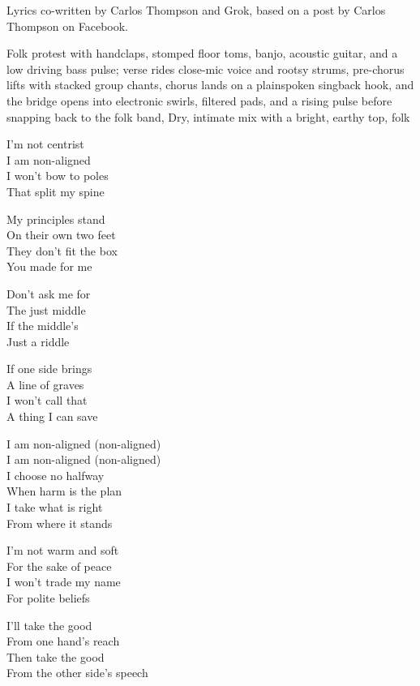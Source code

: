 
\label{sec:no-middle-seat}
\begin{notes}
Lyrics co-written by Carlos Thompson and Grok, based on a post by Carlos Thompson on Facebook.
\end{notes}
\begin{style}
Folk protest with handclaps, stomped floor toms, banjo, acoustic guitar, and a low driving bass pulse; verse rides close-mic voice and rootsy strums, pre-chorus lifts with stacked group chants, chorus lands on a plainspoken singback hook, and the bridge opens into electronic swirls, filtered pads, and a rising pulse before snapping back to the folk band, Dry, intimate mix with a bright, earthy top, folk
\end{style}
\begin{lyrics}
I’m not centrist\\
I am non-aligned\\
I won’t bow to poles\\
That split my spine

My principles stand\\
On their own two feet\\
They don’t fit the box\\
You made for me

Don’t ask me for\\
The just middle\\
If the middle’s\\
Just a riddle

If one side brings\\
A line of graves\\
I won’t call that\\
A thing I can save

I am non-aligned (non-aligned)\\
I am non-aligned (non-aligned)\\
I choose no halfway\\
When harm is the plan\\
I take what is right\\
From where it stands

I’m not warm and soft\\
For the sake of peace\\
I won’t trade my name\\
For polite beliefs

I’ll take the good\\
From one hand’s reach\\
Then take the good\\
From the other side’s speech


\end{lyrics}
